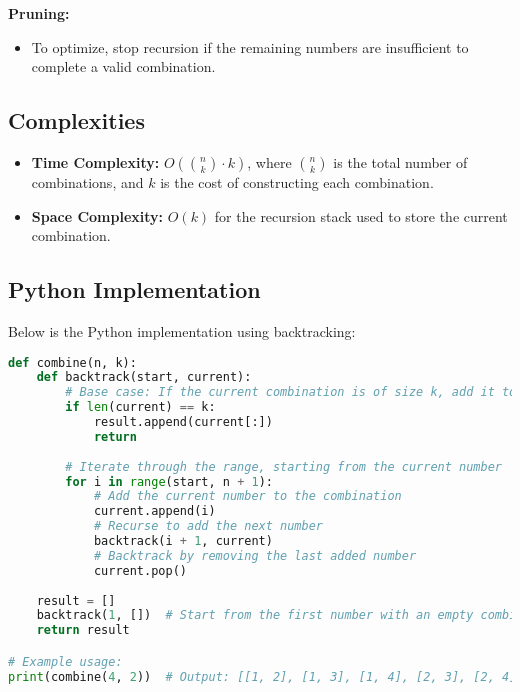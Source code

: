 \textbf{Pruning:}
\begin{itemize}
    \item To optimize, stop recursion if the remaining numbers are insufficient to complete a valid combination.
\end{itemize}

\subsection*{Complexities}
\begin{itemize}
    \item \textbf{Time Complexity:} \( O\left(\binom{n}{k} \cdot k\right) \), where \( \binom{n}{k} \) is the total number of combinations, and \( k \) is the cost of constructing each combination.
    \item \textbf{Space Complexity:} \( O(k) \) for the recursion stack used to store the current combination.
\end{itemize}

\subsection*{Python Implementation}
Below is the Python implementation using backtracking:

\begin{fullwidth}
\begin{lstlisting}[language=Python]
def combine(n, k):
    def backtrack(start, current):
        # Base case: If the current combination is of size k, add it to the result
        if len(current) == k:
            result.append(current[:])
            return
        
        # Iterate through the range, starting from the current number
        for i in range(start, n + 1):
            # Add the current number to the combination
            current.append(i)
            # Recurse to add the next number
            backtrack(i + 1, current)
            # Backtrack by removing the last added number
            current.pop()
    
    result = []
    backtrack(1, [])  # Start from the first number with an empty combination
    return result

# Example usage:
print(combine(4, 2))  # Output: [[1, 2], [1, 3], [1, 4], [2, 3], [2, 4], [3, 4]]
\end{lstlisting}
\end{fullwidth}

